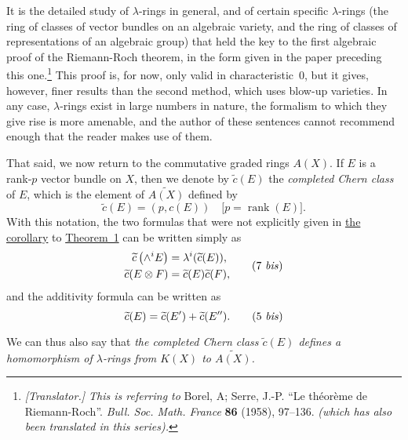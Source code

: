 \documentclass{article}
\DeclareMathOperator{\rank}{rank}
\newcommand{\oldpage}[1]{\marginpar{\footnotesize$\Big\vert$ \textit{p.~#1}}}
\begin{document}
\begin{enumerate}
    \renewcommand*{\thefootnote}{*}
    It is the detailed study of $\lambda$-rings in general, and of certain specific $\lambda$-rings (the ring of classes of vector bundles on an algebraic variety, and the ring of classes of representations of an algebraic group) that held the key to the first algebraic proof of the Riemann-Roch theorem, in the form given in the paper preceding this one.\footnote{\emph{[Translator.] This is referring to} {\sc Borel, A; Serre, J.-P.} ``Le th\'{e}or\`{e}me de Riemann-Roch''. \emph{Bull. Soc. Math. France} {\bf 86} (1958),   97--136. \emph{(which has also been translated in this series).}}
    This proof is, for now, only valid in characteristic~$0$, but it gives, however, finer results than the second method, which uses blow-up varieties.
    In any case, $\lambda$-rings exist in large numbers in nature, the formalism to which they give rise is more amenable, and the author of these sentences cannot recommend enough that the reader makes use of them.

    That said, we now return to the commutative graded rings $A(X)$.
    If $E$ is a rank-$p$ vector bundle on $X$, then we denote by $\widetilde{c}(E)$ the \emph{completed Chern class} of $E$, which is the element of $\widetilde{A(X)}$ defined by
    \[
    \label{equation14}
      \widetilde{c}(E) = (p,c(E))
      \quad\mbox{[$p=\rank(E)$].}
    \tag{14}
    \]
    With this notation, the two formulas that were not explicitly given in \hyperref[theorem1corollary]{the corollary} to \hyperref[theorem1]{Theorem~1} can be written simply as
    \[
    \label{equation7bis}
      \begin{aligned}
        \widetilde{c}\left(\wedge^i E\right) &= \lambda^i(\widetilde{c}(E)),
      \\\widetilde{c}(E\otimes F) &= \widetilde{c}(E)\widetilde{c}(F),
      \end{aligned}
    \tag{7 \emph{bis}}
    \]
    and the additivity formula can be written as
    \[
    \label{equation5bis}
      \widetilde{c}(E) = \widetilde{c}(E') + \widetilde{c}(E'').
    \tag{5 \emph{bis}}
    \]

\oldpage{150}
    We can thus also say that \emph{the completed Chern class $\widetilde{c}(E)$ defines a homomorphism of $\lambda$-rings from $K(X)$ to $\widetilde{A(X)}$.}


\end{enumerate}
\end{document}
